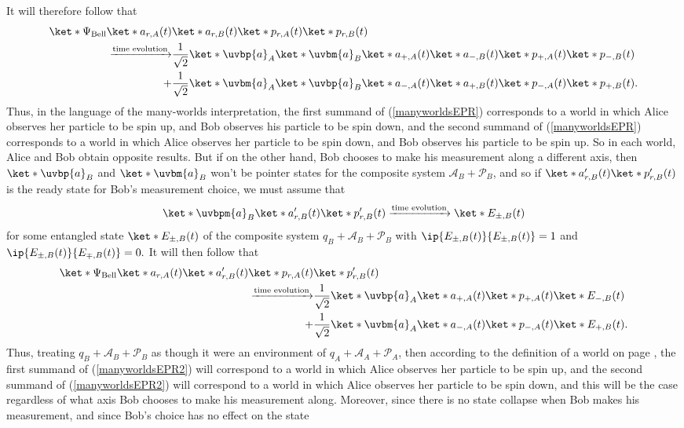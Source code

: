 \documentclass[12pt]{report}
\begin{document}
It will therefore follow that 
\begin{equation}\label{manyworldsEPR}
  \begin{split}\ket*{\Psi_{\text{Bell}}}\ket*{a_{r,A}(t)}&\ket*{a_{r,B}(t)}\ket*{p_{r, A}(t)}\ket*{p_{r, B}(t)}\\ 
    \xrightarrow{\text{time evolution}}&\frac{1}{\sqrt{2}}\ket*{\uvbp{a}}_A\ket*{\uvbm{a}}_B\ket*{a_{+,A}(t)}\ket*{a_{-,B}(t)}\ket*{p_{+, A}(t)}\ket*{p_{-, B}(t)}\\
  +& \frac{1}{\sqrt{2}}\ket*{\uvbm{a}}_A\ket*{\uvbp{a}}_B\ket*{a_{-,A}(t)}\ket*{a_{+,B}(t)}\ket*{p_{-, A}(t)}\ket*{p_{+, B}(t)}.\end{split}
\end{equation}
Thus, in the language of the many-worlds interpretation, the first summand of (\ref{manyworldsEPR}) corresponds to a world in which Alice observes her particle to be spin up, and Bob observes his particle to be spin down, and the second summand of (\ref{manyworldsEPR}) corresponds to a world in which Alice observes her particle to be spin down, and Bob observes his particle to be spin up. So in each world, Alice and Bob obtain opposite results. But if on the other hand, Bob chooses to make his measurement along a different axis, then $\ket*{\uvbp{a}}_B$ and $\ket*{\uvbm{a}}_B$ won't be pointer states for the composite system $\mathcal{A}_B+\mathcal{P}_B$, and so if   $\ket*{a_{r,B}'(t)}\ket*{p_{r, B}'(t)}$ is the ready state for Bob's measurement choice, we must assume that
$$\ket*{\uvbpm{a}}_B\ket*{a_{r,B}'(t)}\ket*{p_{r, B}'(t)}\xrightarrow{\text{time evolution}}\ket*{E_{\pm,B}(t)}$$ 
for some entangled state $\ket*{E_{\pm,B}(t)}$ of the composite system $q_B+\mathcal{A}_B+\mathcal{P}_B$ with $\ip{E_{\pm,B}(t)}{E_{\pm,B}(t)}=1$ and   $\ip{E_{\pm,B}(t)}{E_{\mp,B}(t)}=0.$ It will then follow that 
\begin{equation}\label{manyworldsEPR2}
  \begin{split}\ket*{\Psi_{\text{Bell}}}\ket*{a_{r,A}(t)}\ket*{a_{r,B}'(t)}\ket*{p_{r, A}(t)}&\ket*{p_{r, B}'(t)}\\ 
    \xrightarrow{\text{time evolution}}&\frac{1}{\sqrt{2}}\ket*{\uvbp{a}}_A\ket*{a_{+,A}(t)}\ket*{p_{+, A}(t)}\ket*{E_{-,B}(t)}\\
  +& \frac{1}{\sqrt{2}}\ket*{\uvbm{a}}_A\ket*{a_{-,A}(t)}\ket*{p_{-, A}(t)}\ket*{E_{+,B}(t)}.\end{split}
\end{equation}
Thus, treating $q_B+\mathcal{A}_B+\mathcal{P}_B$ as though it were an environment of $q_A+\mathcal{A}_A+\mathcal{P}_A$, then according to the definition of a world on page \pageref{rigorousworld}, the first summand of (\ref{manyworldsEPR2}) will correspond to a world in which Alice observes her particle to be spin up, and the second summand of (\ref{manyworldsEPR2}) will correspond to a world in which Alice observes her particle to be spin down, and this will be the case regardless of what axis Bob chooses to make his measurement along. Moreover, since there is no state collapse when Bob makes his measurement, and since Bob's choice has no effect on the state 
\end{document}
